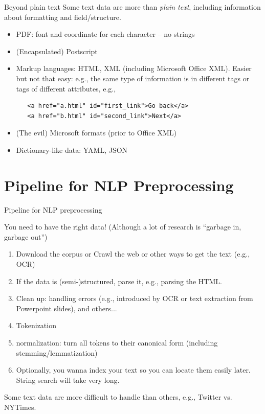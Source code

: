 \documentclass[11pt]{beamer}
\begin{document}
\begin{frame}[fragile]{Beyond plain text}
Some text data are more than \emph{plain text}, including information about formatting and field/structure. 
 \begin{itemize}
  \item PDF: font and coordinate for each character -- no strings
  \item (Encapsulated) Postscript 
  \item Markup languages: HTML, XML (including Microsoft Office XML). Easier but not that easy: e.g., the same type of information is in different tags or tags of different attributes, e.g., 
  \begin{verbatim}
   <a href="a.html" id="first_link">Go back</a>
   <a href="b.html" id="second_link">Next</a> 
  \end{verbatim}
  \item (The evil) Microsoft formats (prior to Office XML)
  \item Dictionary-like data: YAML, JSON
 \end{itemize}
\end{frame}

 
\section{Pipeline for NLP Preprocessing}
\begin{frame}{Pipeline for NLP preprocessing}

You need to have the right data! (Although a lot of research is ``garbage in, garbage out'')

\begin{enumerate}[<+->]
 \item Download the corpus or Crawl the web or other ways to get the text (e.g., OCR) 
 \item If the data is (semi-)structured, parse it, e.g., parsing the HTML. 
 \item Clean up: handling errors (e.g., introduced by OCR or text extraction from Powerpoint slides), and others...
 \item Tokenization 
 \item normalization: turn all tokens to their canonical form (including stemming/lemmatization)
 \item Optionally, you wanna index your text so you can locate them easily later. String search will take very long. 
\end{enumerate}
Some text data are more difficult to handle than others, e.g., Twitter vs. NYTimes. 
\end{frame}
 
\end{document}
